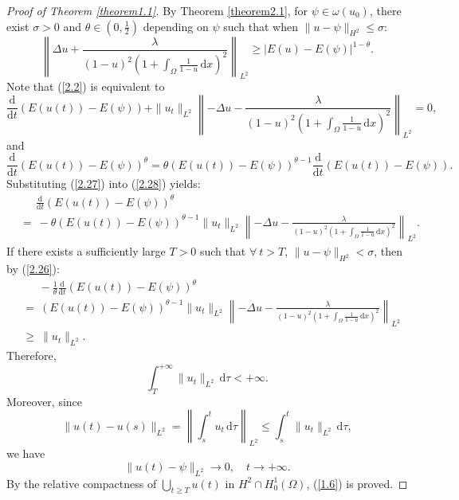 \documentclass{article}
\numberwithin{equation}{section}
\begin{document}
\begin{proof}[Proof of Theorem \ref{theorem1.1}]
    By Theorem \ref{theorem2.1}, for $\psi\in\omega(u_0)$, there exist $\sigma>0$ and $\theta\in (0,\frac{1}{2})$ depending on $\psi$ such that when $\|u-\psi\|_{H^2}\le\sigma$:
    \begin{equation}
        \left\|\Delta u+\frac{\lambda}{(1-u)^2(1+\int_{\Omega}\frac{1}{1-u}\,\mathrm{d}x)^2}\right\|_{L^{2}}\ge |E(u)-E(\psi)|^{1-\theta}.\label{2.26}
    \end{equation}
    Note that (\ref{2.2}) is equivalent to
    \begin{equation}
        \frac{\mathrm{d}}{\mathrm{d}t}(E(u(t))-E(\psi))+\|u_t\|_{L^2}\left\|-\Delta u-\frac{\lambda}{(1-u)^2(1+\int_{\Omega}\frac{1}{1-u}\,\mathrm{d}x)^2}\right\|_{L^2}=0,\label{2.27}
    \end{equation}
    and
    \begin{equation}
        \frac{\mathrm{d}}{\mathrm{d}t}(E(u(t))-E(\psi))^{\theta}=\theta(E(u(t))-E(\psi))^{\theta-1} \frac{\mathrm{d}}{\mathrm{d}t}(E(u(t))-E(\psi)).\label{2.28}
    \end{equation}
    Substituting (\ref{2.27}) into (\ref{2.28}) yields:
    \begin{equation}
        \begin{aligned}
            &\quad\ \ \frac{\mathrm{d}}{\mathrm{d}t}(E(u(t))-E(\psi))^{\theta}\\
            &=\ -\theta(E(u(t))-E(\psi))^{\theta-1}\|u_t\|_{L^2}\left\|-\Delta u-\frac{\lambda}{(1-u)^2(1+\int_{\Omega}\frac{1}{1-u}\,\mathrm{d}x)^2}\right\|_{L^2}.
        \end{aligned}\label{2.29}
    \end{equation}
    If there exists a sufficiently large $T>0$ such that $\forall\ t>T$, $\|u-\psi\|_{H^2}<\sigma$, then by (\ref{2.26}):
    \begin{align*}
        &\quad\ \ -\frac{1}{\theta}\frac{\mathrm{d}}{\mathrm{d}t}(E(u(t))-E(\psi))^{\theta}\\
        &=\ (E(u(t))-E(\psi))^{\theta-1}\|u_t\|_{L^2}\left\|-\Delta u-\frac{\lambda}{(1-u)^2(1+\int_{\Omega}\frac{1}{1-u}\,\mathrm{d}x)^2}\right\|_{L^2}\\
        &\ge\ \|u_t\|_{L^2}.
    \end{align*}
    Therefore,
    $$\int_{T}^{+\infty}\|u_t\|_{L^2}\,\mathrm{d}\tau <+\infty.$$
    Moreover, since
    $$\|u(t)-u(s)\|_{L^2}=\left\|\int_{s}^{t}u_t\,\mathrm{d}\tau\right\|_{L^2}\le \int_{s}^{t}\|u_t\|_{L^2}\,\mathrm{d}\tau,$$
    we have
    $$\|u(t)-\psi\|_{L^2}\to 0,\quad t\to +\infty.$$
    By the relative compactness of $\bigcup_{t\ge T}u(t)$ in $H^2\cap H_0^1(\Omega)$, (\ref{1.6}) is proved.


\end{proof}
\end{document}
